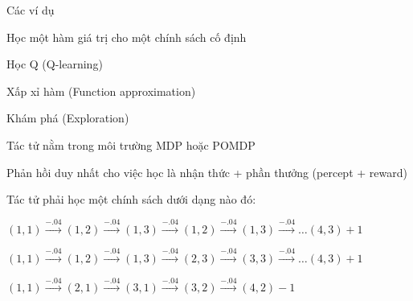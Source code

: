 \documentclass{article}
\begin{document}
\begin{huge}

\sf


\blob Các ví dụ

\blob Học một hàm giá trị cho một chính sách cố định


\blob Học Q (Q-learning)

\blob Xấp xỉ hàm (Function approximation)

\blob Khám phá (Exploration)


\blob Tác tử nằm trong môi trường MDP hoặc POMDP

\blob Phản hồi duy nhất cho việc học là nhận thức + phần thưởng (percept + reward)

\blob Tác tử phải học một chính sách dưới dạng nào đó:





\vspace*{0.2in}
$(1,1) \stackrel{-.04}{\longrightarrow} (1,2) \stackrel{-.04}{\longrightarrow} (1,3) \stackrel{-.04}{\longrightarrow} (1,2) \stackrel{-.04}{\longrightarrow} (1,3) \stackrel{-.04}{\longrightarrow} \dots (4,3) +1$

\vspace*{0.2in}
$(1,1) \stackrel{-.04}{\longrightarrow} (1,2) \stackrel{-.04}{\longrightarrow} (1,3) \stackrel{-.04}{\longrightarrow} (2,3) \stackrel{-.04}{\longrightarrow} (3,3) \stackrel{-.04}{\longrightarrow} \dots (4,3) +1$

\vspace*{0.2in}
$(1,1) \stackrel{-.04}{\longrightarrow} (2,1) \stackrel{-.04}{\longrightarrow} (3,1) \stackrel{-.04}{\longrightarrow} (3,2) \stackrel{-.04}{\longrightarrow} (4,2) -1$


\end{huge}
\end{document}

